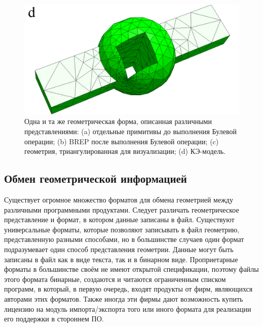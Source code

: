 \begin{figure}[H]
\begin{minipage}[b]{0.495\textwidth}
\end{minipage}
\hspace{0.01\textwidth}
\begin{minipage}[b]{0.495\textwidth}
\includegraphics[width=1.0\textwidth]{pictures/DiffGeoRepr_d.png}
\end{minipage}
\caption{Одна и та же геометрическая форма, описанная различными представлениями: (a) отдельные примитивы до выполнения Булевой операции; (b) BREP после выполнения Булевой операции; (c) геометрия, триангулированная для визуализации; (d) КЭ-модель.}
\label{fig:DiffGeoRepr}
\end{figure}

%                                                              

\subsection{Обмен геометрической информацией}\label{sec:secGeoFormats}


Существует огромное множество форматов для обмена геометрией между различными программными продуктами. Следует различать геометрическое представление и формат, в котором данные записаны в файл. Существуют универсальные форматы, которые позволяют записывать в файл геометрию, представленную разными способами, но в большинстве случаев один формат подразумевает один способ представления геометрии. Данные могут быть записаны в файл как в виде текста, так и в бинарном виде. Проприетарные форматы в большинстве своём не имеют открытой спецификации, поэтому файлы этого формата бинарные, создаются и читаются ограниченным списком программ, в который, в первую очередь, входят продукты от фирм, являющихся авторами этих форматов. Также иногда эти фирмы дают возможность купить лицензию на модуль импорта/экспорта того или иного формата для реализации его поддержки в стороннем ПО.


